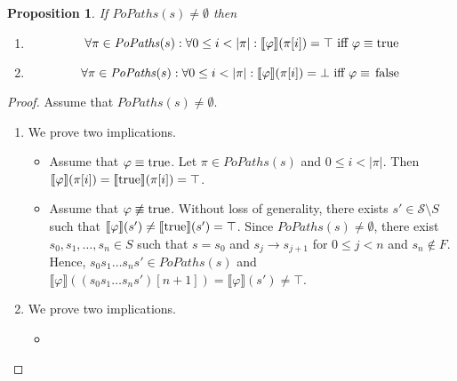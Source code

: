 \documentclass[12pt]{article}
\newcommand{\TRUE}{\mbox{\lstinline{true}}}
\newcommand{\FALSE}{\mbox{\lstinline{false}}}
\newtheorem{proposition}{Proposition}
\theoremstyle{definition}
\newcommand{\satisfaction}[1]{\llbracket #1 \rrbracket}
\newcommand{\bottom}{\mathord{\perp}}
\newenvironment{franck}{\color{red}}{\color{black}}
\begin{document}
\begin{franck}
\begin{proposition}
If $\mathit{PoPaths}(s) \not= \emptyset$ then
\begin{enumerate}
\item
\[
\forall \pi \in \mathit{PoPaths}(s) : \forall 0 \leq i < |\pi| : \satisfaction{\varphi}(\pi[i]) = \top \mbox{ iff } \varphi \equiv \TRUE
\]
\item
\[
\forall \pi \in \mathit{PoPaths}(s) : \forall 0 \leq i < |\pi| : \satisfaction{\varphi}(\pi[i]) = \bottom \mbox{ iff } \varphi \equiv \FALSE
\]
\end{enumerate}
\end{proposition}
\begin{proof}
Assume that $\mathit{PoPaths}(s) \not= \emptyset$.  
\begin{enumerate}
\item
We prove two implications.
\begin{itemize}
\item 
Assume that $\varphi \equiv \TRUE$.  Let $\pi \in \mathit{PoPaths}(s)$ and $0 \leq i < |\pi|$.  Then $\satisfaction{\varphi}(\pi[i]) = \satisfaction{\TRUE}(\pi[i]) = \top$.
\item
Assume that $\varphi \not\equiv \TRUE$.  Without loss of generality, there exists $s' \in \mathcal{S} \setminus S$ such that $\satisfaction{\varphi}(s') \not= \satisfaction{\TRUE}(s') = \top$.  Since $\mathit{PoPaths}(s) \not= \emptyset$, there exist $s_0, s_1, \ldots, s_n \in S$ such that $s = s_0$ and $s_j \rightarrow s_{j+1}$ for $0 \leq j < n$ and $s_n \not\in F$.  Hence, $s_0 s_1 \ldots s_n s' \in \mathit{PoPaths}(s)$ and $\satisfaction{\varphi}((s_0 s_1 \ldots s_n s')[n+1]) = \satisfaction{\varphi}(s') \not= \top$.
\end{itemize}
\item
We prove two implications.
\begin{itemize}
\item 

\end{itemize}
\end{enumerate}
\end{proof}
\end{franck}
\end{document}
